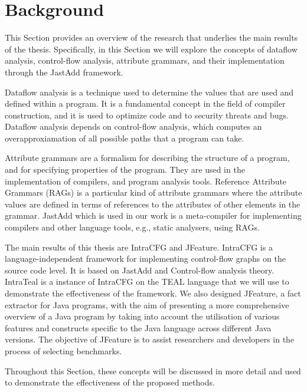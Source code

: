 \section{Background}
\label{sec:background}
This Section provides an overview of the research that 
underlies the main results of the thesis. Specifically, in this Section we will explore
the concepts of dataflow analysis, control-flow analysis, attribute grammars, 
and their implementation through the JastAdd framework.

Dataflow analysis is a technique used to determine the values that are used and 
defined within a program. It is a fundamental concept in the field of compiler 
construction, and it is used to optimize code and to security threats and bugs. 
Dataflow analysis depends on control-flow analysis, which computes an overapproxiamation of
all possible paths that a program can take.

Attribute grammars are a formalism for describing the structure of a program, 
and for specifying properties of the program. They are used in the implementation 
of compilers, and program analysis tools.
Reference Attribute Grammars (RAGs) is a particular kind of attribute grammars 
where the attribute values are defined in terms of references to the attributes 
of other elements in the grammar. JastAdd which is used in our work is a meta-compiler 
for implementing compilers and other language tools, e.g., static analysers, using RAGs.

The main results of this thesis are IntraCFG and JFeature. 
IntraCFG is a language-independent framework for implementing control-flow graphs 
on the source code level.
It is based on JastAdd and Control-flow analysis theory. IntraTeal is a instance
of IntraCFG on the TEAL language that we will use to demonstrate the effectiveness
of the framework. We also designed JFeature, a fact extractor for Java programs,
with the aim of presenting a more comprehensive overview of a Java program by 
taking into account the utilisation of various features and constructs specific 
to the Java language across different Java versions. The objective of JFeature is
to assist researchers and developers in the process of selecting benchmarks.

Throughout this Section, these concepts will be discussed in more detail and used to 
demonstrate the effectiveness of the proposed methods.

